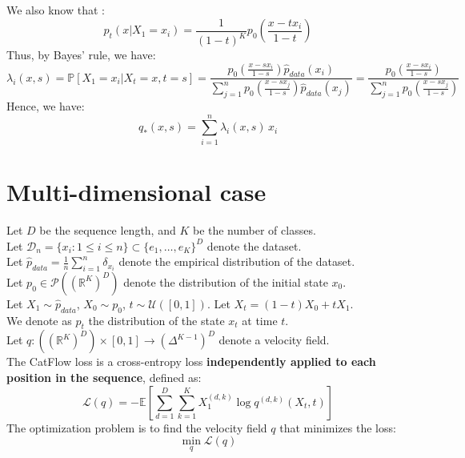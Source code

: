 \documentclass{article}
\begin{document}
We also know that :
\begin{equation}
    p_t(x | X_1 = x_i) = \frac{1}{(1-t)^{K}} p_0 \left( \frac{x - t x_i}{1-t} \right)
\end{equation}
Thus, by Bayes' rule, we have:
\begin{equation}
    \lambda_i(x, s) = \mathbb{P}[X_1 = x_i | X_t = x, t = s] = \frac{p_0 \left( \frac{x - s x_i}{1-s} \right) \hat{p}_{data}(x_i)}{\sum_{j=1}^n p_0 \left( \frac{x - s x_j}{1-s} \right) \hat{p}_{data}(x_j)} = \frac{p_0 \left( \frac{x - s x_i}{1-s} \right)}{\sum_{j=1}^n p_0 \left( \frac{x - s x_j}{1-s} \right)}
\end{equation}
Hence, we have:
\begin{equation}
\boxed{
    q_*(x,s)
    =
    \sum_{i=1}^{n} \lambda_i(x,s)\, x_i
}
\end{equation}

\section{Multi-dimensional case}
Let $D$ be the sequence length, and $K$ be the number of classes. \\
Let $\mathcal{D}_n = \{ x_i : 1 \leq i \leq n \} \subset \{e_1, \ldots, e_K\}^D$  denote the dataset.  \\
Let $\hat{p}_{data} = \frac{1}{n} \sum_{i=1}^n \delta_{x_i}$ denote the empirical distribution of the dataset. \\
Let $p_0 \in \mathcal{P}((\mathbb{R}^K)^D)$ denote the distribution of the initial state $x_0$. \\
Let $X_1 \sim \hat{p}_{data}$, $X_0 \sim p_0$, $t \sim \mathcal{U}([0, 1])$.
Let $X_t = (1-t)X_0 + tX_1$.\\
We denote as $p_t$ the distribution of the state $x_t$ at time $t$. \\
Let $q : ((\mathbb{R}^K)^D) \times [0, 1] \to (\Delta^{K-1})^D$ denote a velocity field. \\

The CatFlow loss is a cross-entropy loss \textbf{independently applied to each position in the sequence}, defined as:
\begin{equation}
    \mathcal{L}(q) = - \mathbb{E} \left[ \sum_{d=1}^{D} \sum_{k=1}^{K} X_1^{(d, k)} \log q^{(d, k)}(X_t, t) \right]
\end{equation}
The optimization problem is to find the velocity field $q$ that minimizes the loss:
\begin{equation}
    \min_{q} \mathcal{L}(q)
\end{equation}
\end{document}
